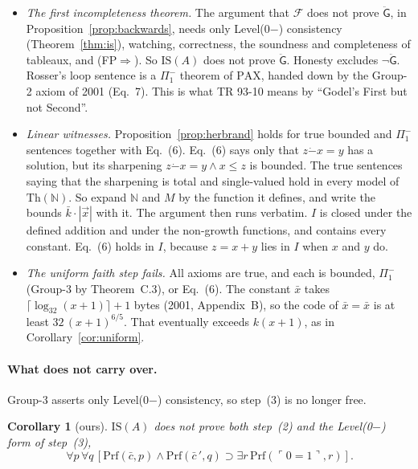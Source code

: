 \documentclass[11pt]{article}
\newcommand{\F}{\mathcal{F}}
\newcommand{\G}{\ddot{\mathsf{G}}}          %
\newcommand{\Prf}{\mathrm{Prf}}
\newcommand{\gn}[1]{\ulcorner #1\urcorner}  %
\theoremstyle{plain}
\newtheorem{corollary}[theorem]{Corollary}
\theoremstyle{definition}
\begin{document}
\begin{itemize}[leftmargin=1.5em]
  that no tableau proof of $0 = 1$ exists, and this is true by
  Theorem~\ref{thm:is}.
\item \emph{The first incompleteness theorem.} The argument that $\F$ does
  not prove $\G$, in Proposition~\ref{prop:backwards}, needs only Level(0$-$)
  consistency (Theorem~\ref{thm:is}), watching, correctness, the soundness and
  completeness of tableaux, and (FP$\Rightarrow$). So $\mathrm{IS}(A)$ does
  not prove $\G$. Honesty excludes $\neg\G$. Rosser's
  loop sentence is a $\Pi_1^-$ theorem of $\mathrm{PAX}$, handed down by the
  Group-2 axiom of 2001 (Eq.~7). This is what TR 93-10 means by ``Godel's
  First but not Second''.
\item \emph{Linear witnesses.} Proposition~\ref{prop:herbrand} holds for true
  bounded and $\Pi_1^-$ sentences together with Eq.~(6). Eq.~(6) says only
  that $z \mathbin{\dot-} x = y$ has a solution, but its sharpening
  $z \mathbin{\dot-} x = y \wedge x \le z$ is bounded. The true sentences
  saying that the sharpening is total and single-valued hold in every model of
  $\mathrm{Th}(\mathbb N)$. So expand $\mathbb N$ and $M$ by the function it
  defines, and write the bounds $\bar k \cdot |\vec x|$ with it. The argument
  then runs verbatim. $I$ is closed under the defined addition and under the
  non-growth functions, and contains every constant. Eq.~(6) holds in $I$,
  because $z = x + y$ lies in $I$ when $x$ and $y$ do.
\item \emph{The uniform faith step fails.} All axioms are true, and each is
  bounded, $\Pi_1^-$ (Group-3 by Theorem~C.3), or Eq.~(6). The constant
  $\bar x$ takes $\lceil\log_{32}(x+1)\rceil + 1$ bytes (2001, Appendix~B), so
  the code of $\bar x = \bar x$ is at least $32\,(x+1)^{6/5}$. That
  eventually exceeds $k(x+1)$, as in Corollary~\ref{cor:uniform}.
\end{itemize}

\paragraph{What does not carry over.} Group-3 asserts only Level(0$-$)
consistency, so step~(3) is no longer free.

\begin{corollary}[ours]\label{cor:is}
$\mathrm{IS}(A)$ does not prove both step~(2) and the Level(0$-$) form of
step~(3),
\[
\forall p\,\forall q\,[\Prf(\bar c, p) \wedge \Prf(\bar c\,', q) \supset
\exists r\,\Prf(\gn{0=1}, r)].
\]
\end{corollary}
\end{document}
